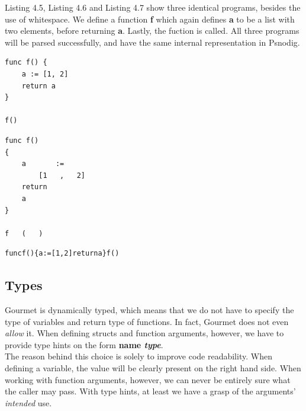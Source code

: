 Listing 4.5, Listing 4.6 and Listing 4.7 show three identical programs, besides the use of whitespace. We define a function \textbf{f} which again defines \textbf{a} to be a list with two elements, before returning \textbf{a}. Lastly, the fuction is called. All three programs will be parsed successfully, and have the same internal representation in Psnodig. \hfill \\

\begin{lstlisting}[caption={f with a standard amount of whitespace}, captionpos=b]
func f() {
    a := [1, 2]
    return a
}

f()    
\end{lstlisting}

\begin{lstlisting}[caption={f with a lot of whitespace}, captionpos=b]
func f()
{
    a       :=
        [1   ,   2]
    return
    a
}

f   (   )
\end{lstlisting}

\begin{lstlisting}[caption={f with no whitespace}, captionpos=b]
funcf(){a:=[1,2]returna}f()
\end{lstlisting}


\subsection{Types}

Gourmet is dynamically typed, which means that we do not have to specify the type of variables and return type of functions. In fact, Gourmet does not even \textit{allow} it. When defining structs and function arguments, however, we have to provide type hints on the form \textbf{name \textit{type}}. \hfill \\

The reason behind this choice is solely to improve code readability. When defining a variable, the value will be clearly present on the right hand side. When working with function arguments, however, we can never be entirely sure what the caller may pass. With type hints, at least we have a grasp of the arguments' \textit{intended} use. \hfill \\

